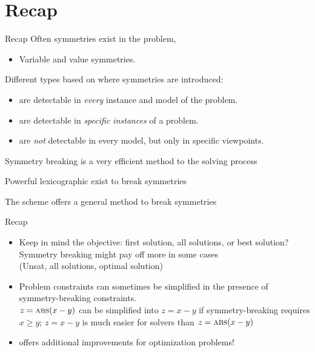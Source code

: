 \documentclass{cons-beamer}
\begin{document}
\section{Recap}

\begin{frame}{Recap}
  Often symmetries exist in the problem, 
  \begin{itemize}
    \item Variable and value symmetries.
  \end{itemize}
  \vfill

  Different types based on where symmetries are introduced:
  \begin{itemize}
    \item {} are
      detectable in \emph{every} instance and model of the problem.
    \item {} are
      detectable in \emph{specific instances} of a problem. \\
    \item {} are \emph{not}
      detectable in every model, but only in specific viewpoints.
  \end{itemize}
  \vfill

  Symmetry breaking is a very efficient method to  the solving process
  \vfill

  Powerful lexicographic  exist to break symmetries
  \vfill

  The  scheme offers a general method to break symmetries
\end{frame}

\begin{frame}{Recap}
  \begin{itemize}
    \item Keep in mind the objective: first solution, all solutions, or best solution? \\
      Symmetry breaking might pay off more in some cases \\
      (Unsat, all solutions, optimal solution) \vfill
    
    \item Problem constraints can sometimes be simplified in the
      presence of symmetry-breaking constraints. \\
       $z = \textsc{abs}(x-y)$ can be simplified
      into $z = x-y$ if symmetry-breaking requires
      $x \geq y$; $z = x-y$ is much easier for solvers than $z = \textsc{abs}(x-y)$
      \vfill

    \item {} offers additional improvements for optimization problems!
  \end{itemize}
\end{frame}
\end{document}
